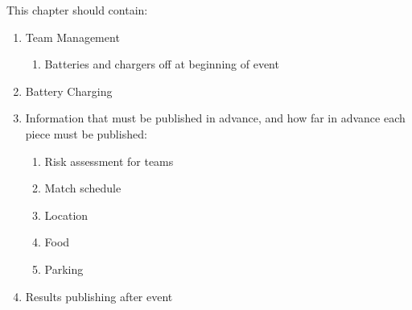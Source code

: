 This chapter should contain:
\begin{enumerate}

\item Team Management
  \begin{enumerate}
  \item Batteries and chargers off at beginning of event
  \end{enumerate}

\item Battery Charging

\item Information that must be published in advance, and how far in advance each piece must be published:
  \begin{enumerate}
  \item Risk assessment for teams
  \item Match schedule
  \item Location
  \item Food
  \item Parking
  \end{enumerate}

\item Results publishing after event
\end{enumerate}
